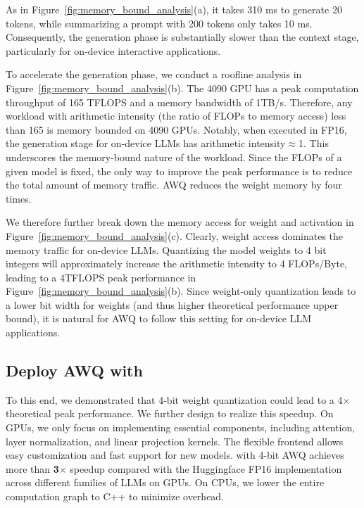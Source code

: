  As in Figure~\ref{fig:memory_bound_analysis}(a), it takes 310 ms to generate 20 tokens, while summarizing a prompt with 200 tokens only takes 10 ms. Consequently, the generation phase is substantially slower than the context stage, particularly for on-device interactive applications. 

 To accelerate the generation phase, we conduct a roofline analysis in Figure~\ref{fig:memory_bound_analysis}(b). The 4090 GPU has a peak computation throughput of 165 TFLOPS and a memory bandwidth of 1TB/s. Therefore, any workload with arithmetic intensity (the ratio of FLOPs to memory access) less than 165 is  memory bounded on 4090 GPUs. Notably, when executed in FP16, the generation stage for on-device LLMs has arithmetic intensity$\approx$1. This underscores the memory-bound nature of the workload. Since the FLOPs of a given model is fixed, the only way to improve the peak performance is to reduce the total amount of memory traffic. AWQ reduces the weight memory by four times. 

 We therefore further break down the memory access for weight and activation in Figure~\ref{fig:memory_bound_analysis}(c). Clearly, weight access dominates the memory traffic for on-device LLMs. Quantizing the model weights to 4 bit integers will approximately increase the arithmetic intensity to 4 FLOPs/Byte, leading to a 4TFLOPS peak performance in Figure~\ref{fig:memory_bound_analysis}(b). Since weight-only quantization leads to a lower bit width for weights (and thus higher theoretical performance upper bound), it is natural for AWQ to follow this setting for on-device LLM applications.

\subsection{Deploy AWQ with \system}

To this end, we demonstrated that 4-bit weight quantization could lead to a 4$\times$ theoretical peak performance. We further design \system to realize this speedup. On GPUs, we only focus on implementing essential components, including attention, layer normalization, and linear projection kernels. The flexible frontend allows easy customization and fast support for new models. \system with 4-bit AWQ achieves more than \textbf{3$\times$} speedup compared with the Huggingface FP16 implementation across different families of LLMs on GPUs. On CPUs, we lower the entire computation graph to C++ to minimize overhead.

